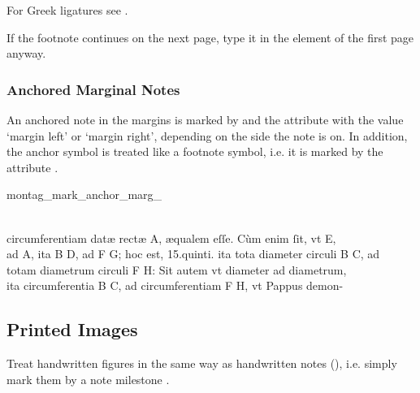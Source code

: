 \begin{crossref}
For Greek ligatures see .
\end{crossref}

\begin{note}
If the footnote continues on the next page, type it in the  element of the first page anyway.
\end{note}

\subsubsection{Anchored Marginal Notes}
\label{section anchored marginal notes}

\begin{mainruleLessImportant}
An anchored note in the margins is marked by  and the attribute  with the value `margin left' or `margin right', depending on the side the note is on. In addition, the anchor symbol is treated like a footnote symbol, i.e. it is marked by the attribute .
\end{mainruleLessImportant}

\begin{sampleImage}{montag_mark_anchor_marg_} %
\begin{typeLatin}
 \someText \\
circumferentiam datæ rectæ A, æqualem eſſe. Cùm enim ſit, vt E, \\
ad A, ita B D, ad F G; hoc est, 15.\lwr{}quinti. ita tota diameter circuli B C, ad \\
totam diametrum circuli F H: Sit autem vt diameter ad diametrum, \\
ita circumferentia B C, ad circumferentiam F H, vt Pappus demon-  \\
\someText {}
\end{typeLatin}
\end{sampleImage}

\label{section anchored comments}

\tocspace
\subsection{Printed Images}

\begin{note}
Treat handwritten figures in the same way as handwritten notes (), i.e. simply mark them by a note milestone .
\end{note}

